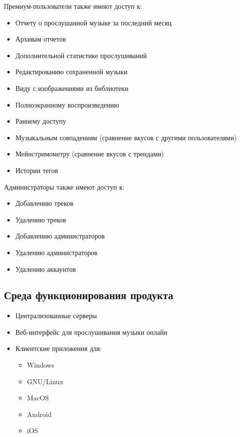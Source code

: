 Премиум-пользователи также имеют доступ к:
\begin{itemize}
    \item Отчету о прослушанной музыке за последний месяц
    \item Архивам отчетов
    \item Дополнительной статистике прослушиваний
    \item Редактированию сохраненной музыки
    \item Виду с изображениями из библиотеки
    \item Полноэкранному воспроизведению
    \item Раннему доступу
    \item Музыкальным совпадениям (сравнение вкусов с другими пользователями)
    \item Мейнстримометру (сравнение вкусов с трендами)
    \item Истории тегов
\end{itemize}

Администраторы также имеют доступ к:
\begin{itemize}
    \item Добавлению треков
    \item Удалению треков
    \item Добавлению администраторов
    \item Удалению администраторов
    \item Удалению аккаунтов
\end{itemize}

\subsection{Среда функционирования продукта}
\begin{itemize}
    \item Централизованные серверы
    \item Веб-интерфейс для прослушивания музыки онлайн
    \item Клиентские приложения для:
    \begin{itemize}
        \item Windows
        \item GNU/Linux
        \item MacOS
        \item Android
        \item iOS
    \end{itemize}
\end{itemize}

